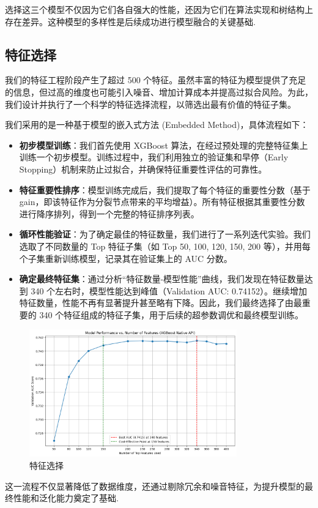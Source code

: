 \documentclass{thuemp}
\begin{document}
选择这三个模型不仅因为它们各自强大的性能，还因为它们在算法实现和树结构上存在差异。这种模型的多样性是后续成功进行模型融合的关键基础.

\subsection{特征选择}

我们的特征工程阶段产生了超过 500 个特征。虽然丰富的特征为模型提供了充足的信息，但过高的维度也可能引入噪音、增加计算成本并提高过拟合风险。为此，我们设计并执行了一个科学的特征选择流程，以筛选出最有价值的特征子集。

我们采用的是一种基于模型的嵌入式方法 (Embedded Method)，具体流程如下：

\begin{itemize}
    \item \textbf{初步模型训练}：我们首先使用 XGBoost 算法，在经过预处理的完整特征集上训练一个初步模型。训练过程中，我们利用独立的验证集和早停（Early Stopping）机制来防止过拟合，并确保特征重要性评估的可靠性。
    \item \textbf{特征重要性排序}：模型训练完成后，我们提取了每个特征的重要性分数（基于 gain，即该特征作为分裂节点带来的平均增益）。所有特征根据其重要性分数进行降序排列，得到一个完整的特征排序列表。
    \item \textbf{循环性能验证}：为了确定最佳的特征数量，我们进行了一系列迭代实验。我们选取了不同数量的 Top 特征子集（如 Top 50, 100, 120, 150, 200 等），并用每个子集重新训练模型，记录其在验证集上的 AUC 分数。
    \item \textbf{确定最终特征集}：通过分析“特征数量-模型性能”曲线，我们发现在特征数量达到 340 个左右时，模型性能达到峰值（Validation AUC: 0.74152）。继续增加特征数量，性能不再有显著提升甚至略有下降。因此，我们最终选择了由最重要的 340 个特征组成的特征子集，用于后续的超参数调优和最终模型训练。
\end{itemize}

\begin{figure}[H]
\centering
\includegraphics[width=0.8\textwidth]{results/__results___files/__results___32_32.png}
\caption{特征选择}
\label{fig:feature_selection}
\end{figure}
这一流程不仅显著降低了数据维度，还通过剔除冗余和噪音特征，为提升模型的最终性能和泛化能力奠定了基础.
\end{document}
